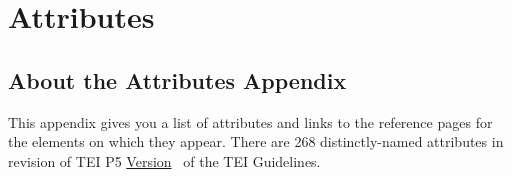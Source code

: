 
\section[{Attributes}]{Attributes}\label{REF-ATTS}
\subsection[{About the Attributes Appendix}]{About the Attributes Appendix}\par
This appendix gives you a list of attributes and links to the reference pages for the elements on which they appear. There are 268 distinctly-named attributes in revision  of TEI P5 \hyperref[ABTEI4]{Version}  of the TEI Guidelines. \par 
